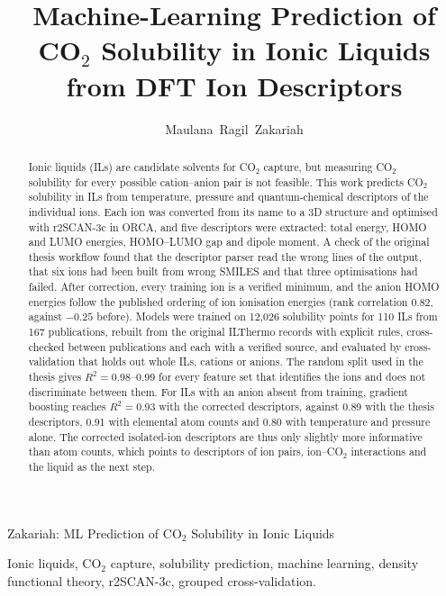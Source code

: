 \documentclass[journal,onecolumn,11pt,a4paper,draftclsnofoot]{IEEEtran}
\newcommand{\co}{CO$_2$}
\begin{document}
\title{Machine-Learning Prediction of CO$_2$ Solubility in Ionic Liquids from DFT Ion Descriptors}

\author{Maulana~Ragil~Zakariah}

\markboth{}%
{Zakariah: ML Prediction of CO$_2$ Solubility in Ionic Liquids}

\maketitle

\begin{abstract}
Ionic liquids (ILs) are candidate solvents for \co{} capture, but measuring \co{} solubility for every possible cation--anion pair is not feasible. This work predicts \co{} solubility in ILs from temperature, pressure and quantum-chemical descriptors of the individual ions. Each ion was converted from its name to a 3D structure and optimised with r2SCAN-3c in ORCA, and five descriptors were extracted: total energy, HOMO and LUMO energies, HOMO--LUMO gap and dipole moment. A check of the original thesis workflow found that the descriptor parser read the wrong lines of the output, that six ions had been built from wrong SMILES and that three optimisations had failed. After correction, every training ion is a verified minimum, and the anion HOMO energies follow the published ordering of ion ionisation energies (rank correlation 0.82, against $-0.25$ before). Models were trained on 12,026 solubility points for 110 ILs from 167 publications, rebuilt from the original ILThermo records with explicit rules, cross-checked between publications and each with a verified source, and evaluated by cross-validation that holds out whole ILs, cations or anions. The random split used in the thesis gives $R^2 = 0.98$--0.99 for every feature set that identifies the ions and does not discriminate between them. For ILs with an anion absent from training, gradient boosting reaches $R^2 = 0.93$ with the corrected descriptors, against 0.89 with the thesis descriptors, 0.91 with elemental atom counts and 0.80 with temperature and pressure alone. The corrected isolated-ion descriptors are thus only slightly more informative than atom counts, which points to descriptors of ion pairs, ion--\co{} interactions and the liquid as the next step.
\end{abstract}

\begin{IEEEkeywords}
Ionic liquids, CO$_2$ capture, solubility prediction, machine learning, density functional theory, r2SCAN-3c, grouped cross-validation.
\end{IEEEkeywords}











\end{document}
